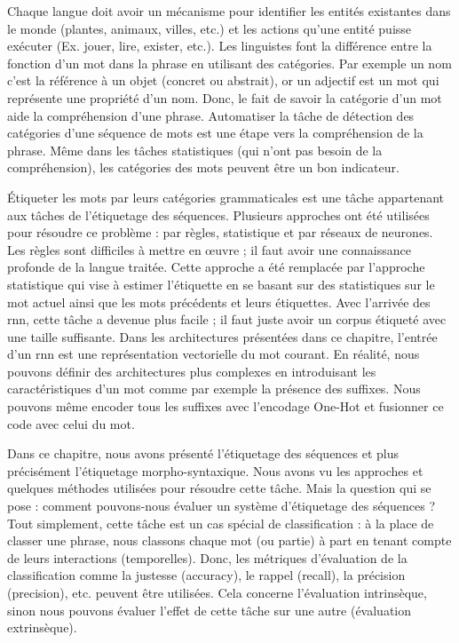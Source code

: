 \documentclass{KodeBook}
\begin{document}
\begin{discussion}
Chaque langue doit avoir un mécanisme pour identifier les entités existantes dans le monde (plantes, animaux, villes, etc.) et les actions qu'une entité puisse exécuter (Ex. jouer, lire, exister, etc.). 
Les linguistes font la différence entre la fonction d'un mot dans la phrase en utilisant des catégories. 
Par exemple un nom c'est la référence à un objet (concret ou abstrait), or un adjectif est un mot qui représente une propriété d'un nom. 
Donc, le fait de savoir la catégorie d'un mot aide la compréhension d'une phrase. 
Automatiser la tâche de détection des catégories d'une séquence de mots est une étape vers la compréhension de la phrase. 
Même dans les tâches statistiques (qui n'ont pas besoin de la compréhension), les catégories des mots peuvent être un bon indicateur. 

Étiqueter les mots par leurs catégories grammaticales est une tâche appartenant aux tâches de l'étiquetage des séquences. 
Plusieurs approches ont été utilisées pour résoudre ce problème : par règles, statistique et par réseaux de neurones. 
Les règles sont difficiles à mettre en œuvre ; il faut avoir une connaissance profonde de la langue traitée.
Cette approche a été remplacée par l'approche statistique qui vise à estimer l'étiquette en se basant sur des statistiques sur le mot actuel ainsi que les mots précédents et leurs étiquettes.
Avec l'arrivée des \ac{rnn}, cette tâche a devenue plus facile ; il faut juste avoir un corpus étiqueté avec une taille suffisante. 
Dans les architectures présentées dans ce chapitre, l'entrée d'un \ac{rnn} est une représentation vectorielle du mot courant. 
En réalité, nous pouvons définir des architectures plus complexes en introduisant les caractéristiques d'un mot comme par exemple la présence des suffixes. 
Nous pouvons même encoder tous les suffixes avec l'encodage One-Hot et fusionner ce code avec celui du mot. 

Dans ce chapitre, nous avons présenté l'étiquetage des séquences et plus précisément l'étiquetage morpho-syntaxique. 
Nous avons vu les approches et quelques méthodes utilisées pour résoudre cette tâche. 
Mais la question qui se pose : comment pouvons-nous évaluer un système d'étiquetage des séquences ? 
Tout simplement, cette tâche est un cas spécial de classification : à la place de classer une phrase, nous classons chaque mot (ou partie) à part en tenant compte de leurs interactions (temporelles). 
Donc, les métriques d'évaluation de la classification comme la justesse (accuracy), le rappel (recall), la précision (precision), etc. peuvent être utilisées.
Cela concerne l'évaluation intrinsèque, sinon nous pouvons évaluer l'effet de cette tâche sur une autre (évaluation extrinsèque).
\end{discussion}

\ifx\wholebook\relax\else
% 
% 
	
\end{document}
